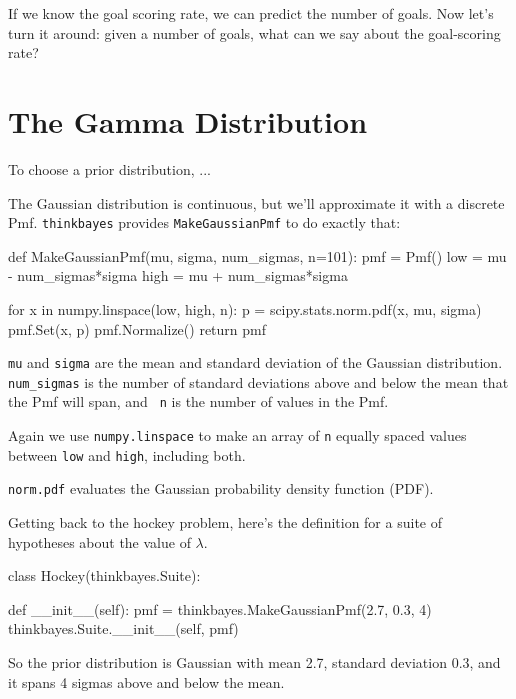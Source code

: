 \documentclass[12pt]{book}
\theoremstyle{exercise}
\begin{document}
If we know the goal scoring rate, we can predict the number of goals.
Now let's turn it around: given a number of goals, what can we say about the goal-scoring rate?


\section{The Gamma Distribution}





To choose a prior distribution, ...

The Gaussian distribution is continuous, but we'll approximate it with
a discrete Pmf.  \verb"thinkbayes" provides \verb"MakeGaussianPmf" to
do exactly that:

\begin{code}
def MakeGaussianPmf(mu, sigma, num_sigmas, n=101):
    pmf = Pmf()
    low = mu - num_sigmas*sigma
    high = mu + num_sigmas*sigma

    for x in numpy.linspace(low, high, n):
        p = scipy.stats.norm.pdf(x, mu, sigma)
        pmf.Set(x, p)
    pmf.Normalize()
    return pmf
\end{code}  

{\tt mu} and {\tt sigma} are the mean and standard deviation of the
Gaussian distribution.  \verb"num_sigmas" is the number of standard
deviations above and below the mean that the Pmf will span, and {\tt
  n} is the number of values in the Pmf.

Again we use {\tt numpy.linspace} to make an array of {\tt n}
equally spaced values between {\tt low} and {\tt high}, including
both.

\verb"norm.pdf" evaluates the Gaussian probability density function (PDF).

Getting back to the hockey problem, here's the definition for a suite
of hypotheses about the value of $\lambda$.

\begin{code}
class Hockey(thinkbayes.Suite):

    def __init__(self):
        pmf = thinkbayes.MakeGaussianPmf(2.7, 0.3, 4)
        thinkbayes.Suite.__init__(self, pmf)
\end{code}  

So the prior distribution is Gaussian with mean 2.7, standard deviation
0.3, and it spans 4 sigmas above and below the mean.
\end{document}
